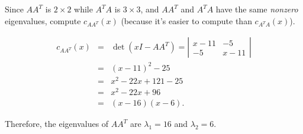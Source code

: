 \documentclass[pdf,9pt]{beamer}
\begin{document}
\begin{frame}[fragile]
\begin{example}[continued]
Since $AA^T$ is $2\times 2$ while $A^T A$ is $3\times 3$, and
$AA^T$ and $A^TA$ have the same {\em nonzero} eigenvalues, compute
$c_{AA^T}(x)$ (because it's easier to compute than $c_{A^TA}(x)$).

\begin{eqnarray*}
    c_{AA^T}(x) & = & \det(xI-AA^T)= \left|\begin{array}{cc} x-11  & -5 \\ -5 & x-11 \end{array}\right| \\
                & = & (x-11)^2 - 25                               \\
                & = & x^2-22x+121-25                              \\
                & = & x^2-22x+96                                  \\
                & = & (x-16)(x-6).
\end{eqnarray*}

Therefore, the eigenvalues of $AA^T$ are $\lambda_1=16$ and $\lambda_2=6$.
\end{example}
\end{frame}
\end{document}
